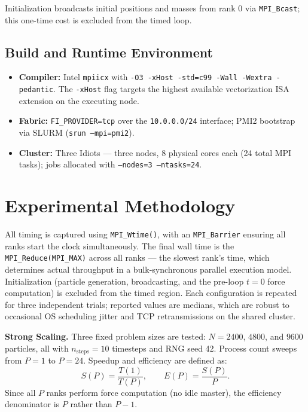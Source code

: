 \documentclass[11pt]{article}
\begin{document}
Initialization broadcasts initial positions and masses from rank 0 via \texttt{MPI\_Bcast}; this one-time cost is excluded from the timed loop.

\subsection{Build and Runtime Environment}

\begin{itemize}
  \item \textbf{Compiler:} Intel \texttt{mpiicx} with \texttt{-O3 -xHost -std=c99 -Wall -Wextra -pedantic}. The \texttt{-xHost} flag targets the highest available vectorization ISA extension on the executing node.
  \item \textbf{Fabric:} \texttt{FI\_PROVIDER=tcp} over the \texttt{10.0.0.0/24} interface; PMI2 bootstrap via SLURM (\texttt{srun --mpi=pmi2}).
  \item \textbf{Cluster:} Three Idiots — three nodes, 8 physical cores each (24 total MPI tasks); jobs allocated with \texttt{--nodes=3 --ntasks=24}.
\end{itemize}

\section{Experimental Methodology}

All timing is captured using \texttt{MPI\_Wtime()}, with an \texttt{MPI\_Barrier} ensuring all ranks start the clock simultaneously. The final wall time is the \texttt{MPI\_Reduce(MPI\_MAX)} across all ranks — the slowest rank's time, which determines actual throughput in a bulk-synchronous parallel execution model. Initialization (particle generation, broadcasting, and the pre-loop $t = 0$ force computation) is excluded from the timed region. Each configuration is repeated for three independent trials; reported values are medians, which are robust to occasional OS scheduling jitter and TCP retransmissions on the shared cluster.

\textbf{Strong Scaling.} Three fixed problem sizes are tested: $N = 2400$, $4800$, and $9600$ particles, all with $n_\text{steps} = 10$ timesteps and RNG seed 42. Process count sweeps from $P = 1$ to $P = 24$. Speedup and efficiency are defined as:
\begin{equation}
  S(P) = \frac{T(1)}{T(P)}, \qquad E(P) = \frac{S(P)}{P}.
\end{equation}
Since all $P$ ranks perform force computation (no idle master), the efficiency denominator is $P$ rather than $P - 1$.
\end{document}
